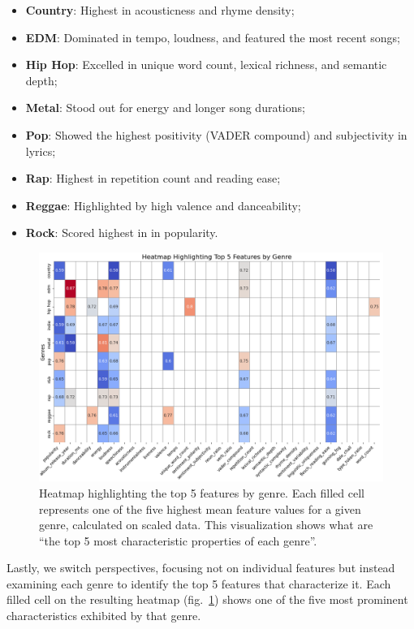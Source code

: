 \begin{itemize}
  \item \textbf{Country}: Highest in acousticness and rhyme density;
  \item \textbf{EDM}: Dominated in tempo, loudness, and featured the most
    recent songs;
  \item \textbf{Hip Hop}: Excelled in unique word count, lexical richness, and
    semantic depth;
  \item \textbf{Metal}: Stood out for energy and longer song durations;
  \item \textbf{Pop}: Showed the highest positivity (VADER compound) and
    subjectivity in lyrics;
  \item \textbf{Rap}: Highest in repetition count and reading ease;
  \item \textbf{Reggae}: Highlighted by high valence and danceability;
  \item \textbf{Rock}: Scored highest in in popularity.
    
\end{itemize}

\begin{center}
\begin{figure}[H]
  \centering
  \includegraphics[width=6in]{img/heatmap_top_feature_values_by_genre.png}
  \caption{Heatmap highlighting the top 5 features by genre. Each filled cell
    represents one of the five highest mean feature values for a given genre,
    calculated on scaled data. This visualization shows what are ``the top 5
    most characteristic properties of each genre''. }
  \label{Figure:heatmap_top_feature_values_by_genre}
\end{figure}
\end{center}

Lastly, we switch perspectives, focusing not on individual features but instead
examining each genre to identify the top 5 features that characterize it. Each
filled cell on the resulting
heatmap (fig.~\ref{Figure:heatmap_top_feature_values_by_genre}) shows one of the
five most prominent characteristics exhibited by that genre.

